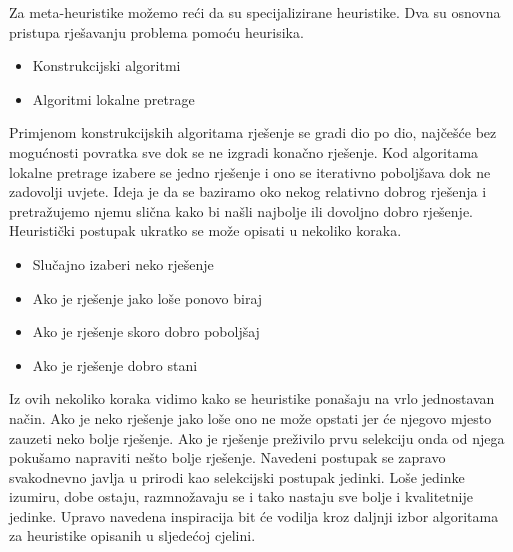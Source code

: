 \documentclass[a4paper,twoside,12pt]{memoir} %
\begin{document}
Za meta-heuristike možemo reći da su specijalizirane heuristike. Dva su osnovna pristupa rješavanju problema pomoću heurisika.
\begin{itemize}
\item Konstrukcijski algoritmi 
\item Algoritmi lokalne pretrage
\end{itemize}
Primjenom konstrukcijskih algoritama rješenje se gradi dio po dio, najčešće bez mogućnosti povratka sve dok se ne izgradi konačno rješenje. Kod algoritama lokalne pretrage izabere se jedno rješenje i ono se iterativno poboljšava dok ne zadovolji uvjete. Ideja je da se baziramo oko nekog relativno dobrog rješenja i pretražujemo njemu slična kako bi našli najbolje ili dovoljno dobro rješenje. Heuristički postupak ukratko se može opisati u nekoliko koraka.
\begin{itemize}
\item Slučajno izaberi neko rješenje
\item Ako je rješenje jako loše ponovo biraj
\item Ako je rješenje skoro dobro poboljšaj 
\item Ako je rješenje dobro stani
\end{itemize}
Iz ovih nekoliko koraka vidimo kako se heuristike ponašaju na vrlo jednostavan način. Ako je neko rješenje jako loše ono ne može opstati jer će njegovo mjesto zauzeti neko bolje rješenje. Ako je rješenje preživilo prvu selekciju onda od njega pokušamo napraviti nešto bolje rješenje. Navedeni postupak se zapravo svakodnevno javlja u prirodi kao selekcijski postupak jedinki. Loše jedinke izumiru, dobe ostaju, razmnožavaju se i tako nastaju sve bolje i kvalitetnije jedinke. Upravo navedena inspiracija bit će vodilja kroz daljnji izbor algoritama za heuristike opisanih u sljedećoj cjelini.
\end{document}

